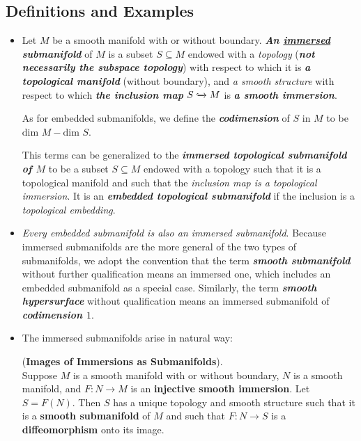 \documentclass[11pt]{article}
\begin{document}
\subsection{Definitions and Examples}
\begin{itemize}
\item \begin{definition}
Let $M$ be a smooth manifold with or without boundary. \textit{\textbf{An \underline{immersed} submanifold}} of $M$ is a subset $S \subseteq M$ endowed with a \emph{topology} (\emph{\textbf{not necessarily the subspace topology}}) with respect to which it is \emph{\textbf{a topological manifold}} (without boundary), and \emph{a smooth structure} with respect to which \emph{\textbf{the inclusion map}} $S \xhookrightarrow{} M$ is \emph{\textbf{a smooth immersion}}. 

As for embedded submanifolds, we define the \emph{\textbf{codimension}} of $S$ in $M$ to be $\text{dim }M - \text{dim }S$. 
\end{definition}

\begin{remark}
This terms can be generalized to the \emph{\textbf{immersed topological submanifold of $M$}} to be a subset $S \subseteq M$ endowed with a topology such that it is a topological manifold and such that the \emph{inclusion map is a topological immersion}. It is an \emph{\textbf{embedded topological submanifold}} if the inclusion is a \emph{topological embedding}. 
\end{remark}

\item \begin{remark}
\emph{Every embedded submanifold is also an immersed submanifold}. Because immersed submanifolds are the more general of the two types of submanifolds, we adopt the convention that the term \emph{\textbf{smooth submanifold}} without further qualification means an immersed one, which includes an embedded submanifold as a special case. Similarly, the term \emph{\textbf{smooth hypersurface}} without qualification means an immersed submanifold of \emph{\textbf{codimension $1$}}.
\end{remark}

\item The immersed submanifolds arise in natural way:
\begin{proposition} (\textbf{Images of Immersions as Submanifolds}). \citep{lee2003introduction} \\
Suppose $M$ is a smooth manifold with or without boundary, $N$ is a smooth manifold, and $F: N \rightarrow M$ is an \textbf{injective smooth immersion}. Let $S = F(N)$. Then $S$ has a unique topology and smooth structure such that it is a \textbf{smooth submanifold} of $M$ and such that $F: N \rightarrow S$ is a \textbf{diffeomorphism} onto its image.
\end{proposition}


\end{itemize}
\end{document}
